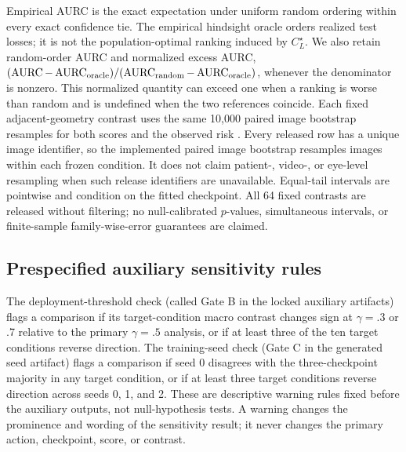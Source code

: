 Empirical AURC is the exact expectation under uniform random ordering within
every exact confidence tie. The empirical hindsight oracle orders realized test
losses; it is not the population-optimal ranking induced by \(C_L^\star\). We
also retain random-order AURC and normalized excess AURC,
\((\operatorname{AURC}-\operatorname{AURC}_{\rm oracle})/(\operatorname{AURC}_{\rm random}-\operatorname{AURC}_{\rm oracle})\), whenever
the denominator is nonzero. This normalized quantity can exceed one when a
ranking is worse than random and is undefined when the two references coincide.
Each fixed adjacent-geometry contrast uses the same 10,000 paired image
bootstrap resamples for both scores and the observed risk \citep{efron1993}.
Every released row has a unique image identifier, so the implemented paired
image bootstrap resamples images within each frozen condition. It does not claim
patient-, video-, or eye-level resampling when such release identifiers are
unavailable. Equal-tail intervals are pointwise and condition on the fitted
checkpoint. All 64 fixed contrasts are released without filtering; no
null-calibrated \(p\)-values, simultaneous intervals, or finite-sample
family-wise-error guarantees are claimed.

\subsection{Prespecified auxiliary sensitivity rules}

The deployment-threshold check (called Gate B in the locked auxiliary
artifacts) flags a comparison if its target-condition macro contrast changes
sign at \(\gamma=.3\) or .7 relative to the primary \(\gamma=.5\) analysis, or
if at least three of the ten target conditions reverse direction. The
training-seed check (Gate C in the generated seed artifact) flags a comparison
if seed 0 disagrees with the three-checkpoint majority in any target condition,
or if at least three target conditions reverse direction across seeds 0, 1,
and 2. These are descriptive warning rules fixed before the auxiliary outputs,
not null-hypothesis tests. A warning changes the prominence and wording of the
sensitivity result; it never changes the primary action, checkpoint, score, or
contrast.
